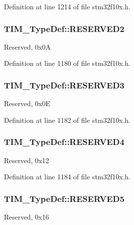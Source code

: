 Definition at line 1214 of file stm32f10x.\-h.

\hypertarget{struct_t_i_m___type_def_af62f86f55f2a387518f3de10d916eb7c}{
\subsubsection[{R\-E\-S\-E\-R\-V\-E\-D2}]{ T\-I\-M\-\_\-\-Type\-Def\-::\-R\-E\-S\-E\-R\-V\-E\-D2}}\label{struct_t_i_m___type_def_af62f86f55f2a387518f3de10d916eb7c}
Reserved, 0x0\-A 

Definition at line 1180 of file stm32f10x.\-h.

\hypertarget{struct_t_i_m___type_def_a8f952613a22049f3ea2b50b7e0d10472}{
\subsubsection[{R\-E\-S\-E\-R\-V\-E\-D3}]{ T\-I\-M\-\_\-\-Type\-Def\-::\-R\-E\-S\-E\-R\-V\-E\-D3}}\label{struct_t_i_m___type_def_a8f952613a22049f3ea2b50b7e0d10472}
Reserved, 0x0\-E 

Definition at line 1182 of file stm32f10x.\-h.

\hypertarget{struct_t_i_m___type_def_a36afe894c9b0878347d0c038c80e4c22}{
\subsubsection[{R\-E\-S\-E\-R\-V\-E\-D4}]{ T\-I\-M\-\_\-\-Type\-Def\-::\-R\-E\-S\-E\-R\-V\-E\-D4}}\label{struct_t_i_m___type_def_a36afe894c9b0878347d0c038c80e4c22}
Reserved, 0x12 

Definition at line 1184 of file stm32f10x.\-h.

\hypertarget{struct_t_i_m___type_def_a15944db86d7a7a69db35512f68eca15c}{
\subsubsection[{R\-E\-S\-E\-R\-V\-E\-D5}]{ T\-I\-M\-\_\-\-Type\-Def\-::\-R\-E\-S\-E\-R\-V\-E\-D5}}\label{struct_t_i_m___type_def_a15944db86d7a7a69db35512f68eca15c}
Reserved, 0x16 

